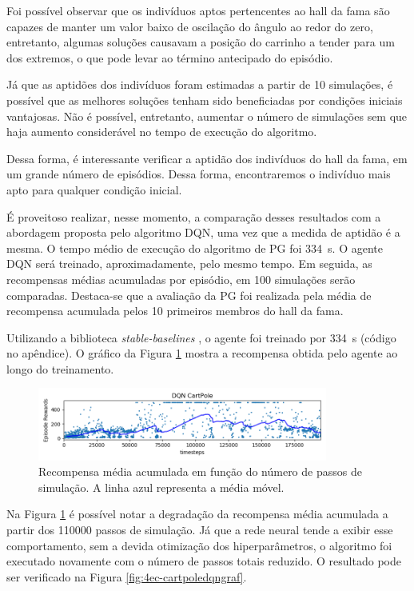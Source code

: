 Foi possível observar que os indivíduos aptos pertencentes ao hall da fama são capazes de manter um valor baixo de oscilação do ângulo ao redor do zero, entretanto, algumas soluções causavam a posição do carrinho a tender para um dos extremos, o que pode levar ao término antecipado do episódio. 

Já que as aptidões dos indivíduos foram estimadas a partir de 10 simulações, é possível que as melhores soluções tenham sido beneficiadas por condições iniciais vantajosas. Não é possível, entretanto, aumentar o número de simulações sem que haja aumento considerável no tempo de execução do algoritmo.

Dessa forma, é interessante verificar a aptidão dos indivíduos do hall da fama, em um grande número de episódios. Dessa forma, encontraremos o indivíduo mais apto para qualquer condição inicial.

É proveitoso realizar, nesse momento, a comparação desses resultados com a abordagem proposta pelo algoritmo DQN, uma vez que a medida de aptidão é a mesma. O tempo médio de execução do algoritmo de PG foi \SI{334}{s}. O agente DQN será treinado, aproximadamente, pelo mesmo tempo. Em seguida, as recompensas médias acumuladas por episódio, em 100 simulações serão comparadas. Destaca-se que a avaliação da PG foi realizada pela média de recompensa acumulada pelos 10 primeiros membros do hall da fama.

Utilizando a biblioteca \textit{stable-baselines} \cite{stable-baselines}, o agente foi treinado por \SI{334}{s} (código no apêndice). O gráfico da Figura \ref{fig:4ec-cartpoledqndiverg} mostra a recompensa obtida pelo agente ao longo do treinamento.

\begin{figure}[H]
	\centering
	\includegraphics[width=0.85\textwidth]{02_desenvolvimento/04_EC_Fig_CartpoleDQNDiverg.png}
	\caption{Recompensa média acumulada em função do número de passos de simulação. A linha azul representa a média móvel.}
	\label{fig:4ec-cartpoledqndiverg}
\end{figure}

Na Figura \ref{fig:4ec-cartpoledqndiverg} é possível notar a degradação da recompensa média acumulada a partir dos 110000 passos de simulação. Já que a rede neural tende a exibir esse comportamento, sem a devida otimização dos hiperparâmetros, o algoritmo foi executado novamente com o número de passos totais reduzido. O resultado pode ser verificado na Figura \ref{fig:4ec-cartpoledqngraf}.

